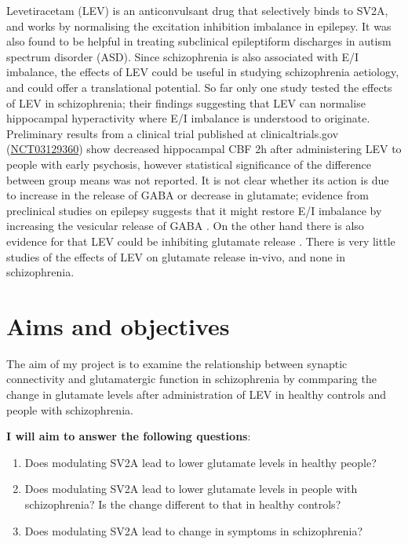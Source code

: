 \documentclass[
  letterpaper,
  DIV=11,
  numbers=noendperiod]{scrartcl}
\providecommand{\tightlist}{%
  \setlength{\itemsep}{0pt}\setlength{\parskip}{0pt}}\usepackage{longtable,booktabs,array}
\begin{document}
Levetiracetam (LEV) is an anticonvulsant drug that selectively binds to
SV2A, and works by normalising the excitation inhibition imbalance in
epilepsy. It was also found to be helpful in treating subclinical
epileptiform discharges in autism spectrum disorder
(ASD)\autocite{wang_levetiracetam_2017}. Since schizophrenia is also
associated with E/I imbalance, the effects of LEV could be useful in
studying schizophrenia aetiology, and could offer a translational
potential. So far only one study tested the effects of LEV in
schizophrenia; their findings suggesting that LEV can normalise
hippocampal hyperactivity \autocite{roeske_modulation_2023} where E/I
imbalance is understood to originate. Preliminary results from a
clinical trial published at clinicaltrials.gov
(\href{https://clinicaltrials.gov/study/NCT03129360?id=NCT03129360&limit=10&rank=1&tab=results}{NCT03129360})\autocite{goff_levetiracetam_2020}
show decreased hippocampal CBF 2h after administering LEV to people with
early psychosis, however statistical significance of the difference
between group means was not reported. It is not clear whether its action
is due to increase in the release of GABA or decrease in
glutamate\autocite{contreras-garcia_levetiracetam_2022}; evidence from
preclinical studies on epilepsy suggests that it might restore E/I
imbalance by increasing the vesicular release of GABA
\autocite{luzadriana_effect_2018}. On the other hand there is also
evidence for that LEV could be inhibiting glutamate release
\autocite{contreras-garcia_synaptic_2021,meehan_levetiracetam_2012,yang_prolonged_2007,lee_levetiracetam_2009}.
There is very little studies of the effects of LEV on glutamate release
in-vivo, and none in schizophrenia.

\section{Aims and objectives}\label{aims-and-objectives}

The aim of my project is to examine the relationship between synaptic
connectivity and glutamatergic function in schizophrenia by commparing
the change in glutamate levels after administration of LEV in healthy
controls and people with schizophrenia.

\textbf{I will aim to answer the following questions}:

\begin{enumerate}
\def\labelenumi{\arabic{enumi}.}
\tightlist
\item
  Does modulating SV2A lead to lower glutamate levels in healthy people?
\item
  Does modulating SV2A lead to lower glutamate levels in people with
  schizophrenia? Is the change different to that in healthy controls?
\item
  Does modulating SV2A lead to change in symptoms in schizophrenia?
\end{enumerate}
\end{document}
